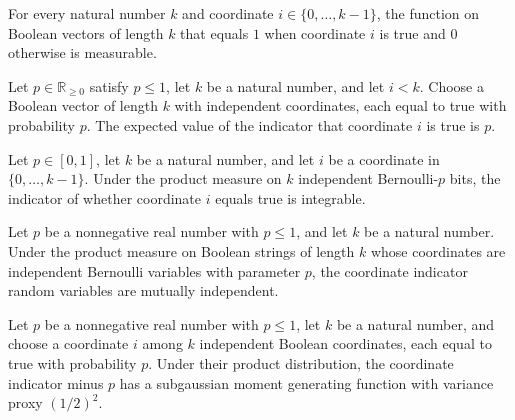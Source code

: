 \begin{theorem}
\label{Randomized.measurable_coordIndicator}
\leanok
{}
For every natural number $k$ and coordinate $i\in\{0,\ldots,k-1\}$, the function on
Boolean vectors of length $k$ that equals $1$ when coordinate $i$ is true and $0$
otherwise is measurable.
\end{theorem}

\begin{theorem}
\label{Randomized.integral_coordIndicator}
\leanok
{}
Let $p\in\mathbb{R}_{\ge 0}$ satisfy $p\le 1$, let $k$ be a natural number, and let
$i<k$. Choose a Boolean vector of length $k$ with independent coordinates, each equal to
true with probability $p$. The expected value of the indicator that coordinate $i$ is
true is $p$.
\end{theorem}

\begin{theorem}
\label{Randomized.integrable_coordIndicator}
\leanok
{}
Let $p\in[0,1]$, let $k$ be a natural number, and let $i$ be a coordinate in
$\{0,\ldots,k-1\}$. Under the product measure on $k$ independent Bernoulli-$p$ bits, the
indicator of whether coordinate $i$ equals true is integrable.
\end{theorem}

\begin{theorem}
\label{Randomized.iIndepFun_coordIndicator}
\leanok
{}
Let $p$ be a nonnegative real number with $p\le 1$, and let $k$ be a natural number.
Under the product measure on Boolean strings of length $k$ whose coordinates are
independent Bernoulli variables with parameter $p$, the coordinate indicator random
variables are mutually independent.
\end{theorem}

\begin{theorem}
\label{Randomized.hasSubgaussianMGF_coordIndicator_sub}
\leanok
{}
Let $p$ be a nonnegative real number with $p\leq 1$, let $k$ be a natural number, and
choose a coordinate $i$ among $k$ independent Boolean coordinates, each equal to true
with probability $p$. Under their product distribution, the coordinate indicator minus
$p$ has a subgaussian moment generating function with variance proxy $(1/2)^2$.
\end{theorem}


